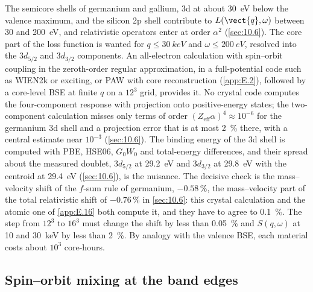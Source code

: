 The semicore shells of germanium and gallium, 3d at about \SI{30}{eV} below the valence maximum, and the silicon 2p shell contribute to $L(\vect{q},\omega)$ between 30 and \SI{200}{eV}, and relativistic operators enter at order $\alpha^2$ (\cref{sec:10.6}). The core part of the loss function is wanted for $q \le \SI{30}{keV}$ and $\omega \le \SI{200}{eV}$, resolved into the $3d_{5/2}$ and $3d_{3/2}$ components. An all-electron calculation with spin--orbit coupling in the zeroth-order regular approximation, in a full-potential code such as WIEN2k or exciting, or PAW with core reconstruction (\cref{app:E.2}), followed by a core-level BSE at finite $q$ on a $12^3$ grid, provides it. No crystal code computes the four-component response with projection onto positive-energy states; the two-component calculation misses only terms of order $(Z_{\mathrm{eff}}\alpha)^4 \approx 10^{-6}$ for the germanium 3d shell and a projection error that is at most \SI{2}{\percent} there, with a central estimate near $10^{-3}$ (\cref{sec:10.6}). The binding energy of the 3d shell is computed with PBE, HSE06, $G_0W_0$ and total-energy differences, and their spread about the measured doublet, $3d_{5/2}$ at \SI{29.2}{eV} and $3d_{3/2}$ at \SI{29.8}{eV} with the centroid at \SI{29.4}{eV} (\cref{sec:10.6}), is the nuisance. The decisive check is the mass--velocity shift of the $f$-sum rule of germanium, $-0.58\,\%$, the mass--velocity part of the total relativistic shift of $-0.76\,\%$ in \cref{sec:10.6}: this crystal calculation and the atomic one of \cref{app:E.16} both compute it, and they have to agree to \SI{0.1}{\percent}. The step from $12^3$ to $16^3$ must change the shift by less than \SI{0.05}{\percent} and $S(q,\omega)$ at 10 and \SI{30}{keV} by less than \SI{2}{\percent}. By analogy with the valence BSE, each material costs about $10^3$ core-hours.

\subsection{Spin--orbit mixing at the band edges}

